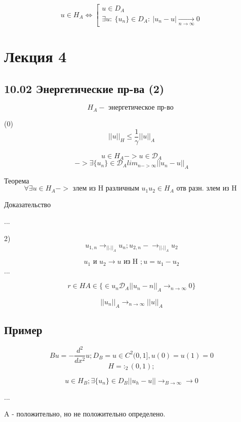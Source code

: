 \documentclass[12pt, a4paper]{article}
\begin{document}
\[ u \in H_A \Leftrightarrow \left[ \begin{array}{l}
	u \in D_A \\
	\exists u : \ \{ u_n \} \in D_A: \ | u_n - u | \underset{n \rightarrow \infty}{\rightarrow} 0
\end{array} \right. \]

\newpage

\section{Лекция 4}

\subsection{10.02 Энергетические пр-ва (2)}

\[ H_A -\textrm{ энергетическое пр-во } \]

(0) \[ {||u||}_H \leq \frac{1}{\gamma   } {||u||}_A \]

\[ u \in H_A -> u \in \mathcal{D}_A \]
\[ -> \exists \{ u_n \} \in \mathcal{D}_A  {lim}_{n-> \infty} || u_n-u||_A \]

Теорема
\[ \forall \exists u \in H_A -> \textrm{  злем из H различным } u_1 u_2 \in H_A \textrm{ отв разн. злем из H }\]

Доказательство

...

2) \[  u_{1, n} \rightarrow_{||.||_A} u_n; u_{2,n} -\rightarrow_{||.||_A} u_2\]

\[ u_1 \textrm{ и  } u_2 \rightarrow u \textrm{ из H }; u = u_1 - u_2\]
...

\[  r \in H A \in \{ \in u_n \mathcal{D}_A ||u_n -n ||_A \rightarrow_{n \rightarrow \infty} 0 \} \]

\[ || u_n ||_A \rightarrow_{n \rightarrow \infty} ||u||_A \]



\subsection{Пример}

\[ Bu = - \frac{d^2}{d x^2} u ; D_{B} = {u \in C^2 (0,1]}, u(0) = u(1) = 0 \]
\[ H = :_2 (0, 1); \]

\[ u \in H_B; \exists \{ u_n \} \in D_B || u_h - u || \rightarrow_{B \rightarrow \infty} \rightarrow 0\]

...

A - положительно, но не положительно определено.
\end{document}
